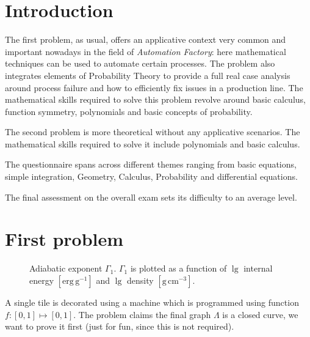 \documentclass{layout}
\begin{document}
\section{Introduction}

The first problem, as usual, offers an applicative context very common and important
nowadays in the field of \emph{Automation Factory}: here mathematical techniques
can be used to automate certain processes. The problem also integrates elements of
Probability Theory to provide a full real case analysis around process failure and how
to efficiently fix issues in a production line. The mathematical skills required to solve
this problem revolve around basic calculus, function symmetry, polynomials and
basic concepts of probability.

The second problem is more theoretical without any applicative scenarios. The
mathematical skills required to solve it include polynomials and basic calculus.

The questionnaire spans across different themes ranging from basic equations,
simple integration, Geometry, Calculus, Probability and differential equations.

The final assessment on the overall exam sets its difficulty to an average level.

\section{First problem}

   \begin{figure*}
   \centering
   \caption{Adiabatic exponent $\Gamma_1$.
               $\Gamma_1$ is plotted as a function of
               $\lg$ internal energy $\mathrm{[erg\,g^{-1}]}$ and $\lg$
               density $\mathrm{[g\,cm^{-3}]}$.}
              \label{FigGam}%
    \end{figure*}
%


A single tile is decorated using a machine which is programmed using function 
$f:[0,1] \mapsto [0,1]$. The problem \cite{exam1} claims the final graph $\Lambda$ is
a closed curve, we want to prove it first (just for fun, since this is not required).
\end{document}
